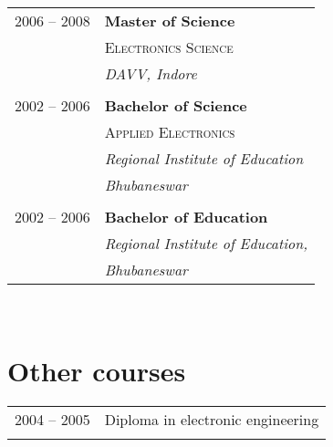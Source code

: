 \documentclass[10pt]{article} %
\begin{document}
{\begin{minipage}[t]{0.44\textwidth}
\begin{tabular}{rl} %


2006 -- 2008 & \textbf{Master of Science} \\ 
& \textsc{Electronics Science} \\ 
& \textit{DAVV, Indore}\\
&\\
	 

2002 -- 2006 & \textbf{Bachelor of Science } \\
& \textsc{Applied Electronics} \\
& \textit{Regional Institute of Education} \\
& \textit{Bhubaneswar}\\	
&\\

	 

2002 -- 2006 & \textbf{Bachelor of Education} \\
& \textit{Regional Institute of Education,} \\
& \textit{Bhubaneswar}\\	


\end{tabular}\\[10pt]


\section{Other courses} 

\begin{tabular}{rl} %


2004 -- 2005 & \normalsize{Diploma in electronic engineering} \\ 
&\\
	 

\end{tabular}
\end{minipage}}
\end{document}
